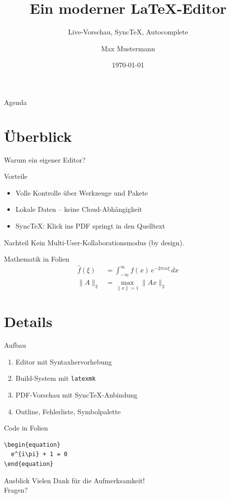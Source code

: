 \documentclass[aspectratio=169,11pt]{beamer}
\title{Ein moderner \LaTeX-Editor}
\subtitle{Live-Vorschau, SyncTeX, Autocomplete}
\author{Max Mustermann}
\institute{Beispiel-Institut}
\date{\today}
\begin{document}
\maketitle

\begin{frame}{Agenda}
  \tableofcontents
\end{frame}

\section{Überblick}

\begin{frame}{Warum ein eigener Editor?}
  \begin{block}{Vorteile}
    \begin{itemize}
      \item Volle Kontrolle über Werkzeuge und Pakete
      \item Lokale Daten – keine Cloud-Abhängigkeit
      \item SyncTeX: Klick ins PDF springt in den Quelltext
    \end{itemize}
  \end{block}

  \begin{alertblock}{Nachteil}
    Kein Multi-User-Kollaborationsmodus (by design).
  \end{alertblock}
\end{frame}

\begin{frame}{Mathematik in Folien}
  \begin{align}
    \hat{f}(\xi) &= \int_{-\infty}^{\infty} f(x)\,e^{-2\pi i x \xi}\,dx \\
    \|A\|_2 &= \max_{\|x\|=1} \|Ax\|_2
  \end{align}
\end{frame}

\section{Details}

\begin{frame}{Aufbau}
  \begin{enumerate}
    \item Editor mit Syntaxhervorhebung
    \item Build-System mit \texttt{latexmk}
    \item PDF-Vorschau mit SyncTeX-Anbindung
    \item Outline, Fehlerliste, Symbolpalette
  \end{enumerate}
\end{frame}

\begin{frame}[fragile]{Code in Folien}
\begin{verbatim}
\begin{equation}
  e^{i\pi} + 1 = 0
\end{equation}
\end{verbatim}
\end{frame}

\begin{frame}{Ausblick}
  \Huge\centering Vielen Dank für die Aufmerksamkeit!\\[1em]
  \normalsize Fragen?
\end{frame}
\end{document}
